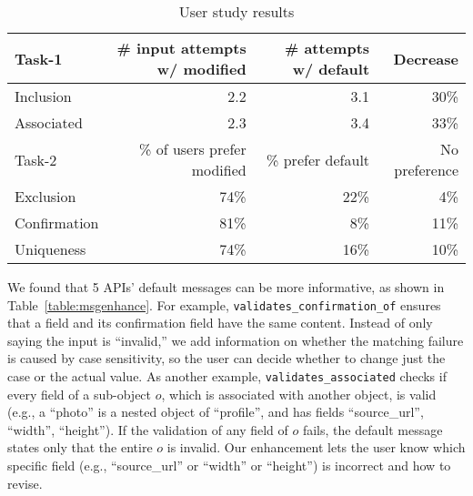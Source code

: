 \begin{table}[]
\centering
\caption{User study results}
\footnotesize{
\setlength{\tabcolsep}{2pt}  
\begin{tabular}{lrrr}
\toprule 
Task-1    & \# input attempts w/ modified & \# attempts w/ default & Decrease \\
\midrule
Inclusion & 2.2 & 3.1 & 30\% \\ \midrule
Associated & 2.3 & 3.4 & 33\% \\
\midrule
\midrule
Task-2 & \% of users prefer modified &  \% prefer default & No preference\\ 
\midrule
Exclusion  & 74\%  & 22\% & 4\%  \\ \midrule
Confirmation  & 81\%  & 8\%  & 11\%  \\ \midrule
Uniqueness  & 74\%  & 16\%  & 10\%  \\
\bottomrule
\end{tabular}
}
\label{table:studyresults}
\footnotesize{}
\end{table}


We found that 5 APIs' default messages can be more informative, as shown in Table~\ref{table:msgenhance}. 
For example, {\tt validates\_confirmation\_of} ensures that a
field and its confirmation field have the same content. Instead of only saying the input is ``invalid,''
we add information on whether the matching failure is caused by case sensitivity, 
so the user can decide whether to change just the case or the actual value.
As another example, {\tt validates\_associated} checks if every field of a sub-object $o$, which is associated with another object, is valid (e.g., a ``photo'' is a nested object of ``profile'', and has
fields ``source\_url'', ``width'', ``height'').
If the validation of any field of $o$ fails, the default message states only that the entire 
$o$ is invalid. 
Our enhancement lets the user know which specific field (e.g., ``source\_url'' or ``width'' or ``height'') is incorrect and how to revise.

